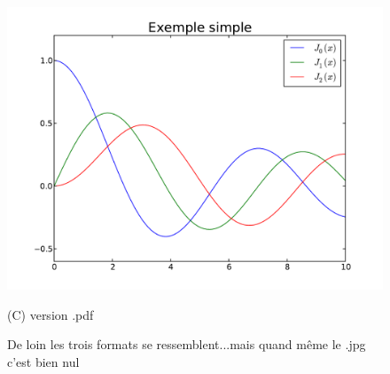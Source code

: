 \begin{figure}[htb]
\begin{minipage}[b]{.33\linewidth}
  \centering
 \centerline{\includegraphics[width=1.\textwidth]{example_simple_pdf}}
  \vspace{0.1cm}
  \centerline{(C) version .pdf}\medskip
\end{minipage}%
\caption{De loin les trois formats se ressemblent...mais quand m\^eme le .jpg c'est bien nul}
\label{fig:ma_figure}
\end{figure}

